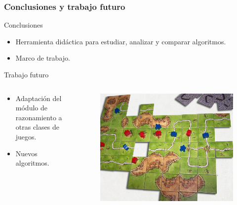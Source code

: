 \documentclass[10pt]{beamer}
\begin{document}
\begin{frame}[t]
\frametitle{Conclusiones y trabajo futuro}
\begin{block}{Conclusiones}

\begin{itemize}
	\item Herramienta didáctica para estudiar, analizar y comparar algoritmos.
	\item Marco de trabajo.
\end{itemize}
\end{block}

\begin{block}{Trabajo futuro}
\begin{columns}
\begin{column}{0.5\linewidth}
\begin{itemize}
	\item Adaptación del módulo de razonamiento a otras clases de juegos.
	\item Nuevos algoritmos.
\end{itemize}
\end{column}
\begin{column}{0.5\linewidth}
\begin{figure}[t]
\centering
\includegraphics[scale=0.05]{imagenes/carcassonne.png}
\label{fig:carcassonne}
\end{figure}
\end{column}
\end{columns}
\end{block}

\end{frame}
\end{document}
